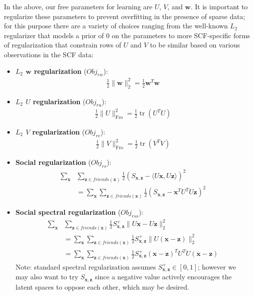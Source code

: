 \documentclass{sig-alternate}
\newcommand{\Fro}{\mathrm{Fro}}
\newcommand{\Obj}{\mathit{Obj}}
\newcommand{\ru}{\mathit{ru}}
\newcommand{\rv}{\mathit{rv}}
\newcommand{\rw}{\mathit{rw}}
\newcommand{\rs}{\mathit{rs}}
\newcommand{\rss}{\mathit{rss}}
\newcommand{\tr}{\operatorname{tr}}
\newcommand{\x}{\vec{x}}
\newcommand{\z}{\vec{z}}
\newcommand{\w}{\vec{w}}
\newcommand{\la}{\langle}
\newcommand{\ra}{\rangle}
\renewcommand{\vec}[1]{\mathbf{#1}}
\newcommand{\subfive}{\hspace{2.5mm}}
\begin{document}
In the above, our free parameters for learning are $U$, $V$, and $\w$.
It is important to regularize these parameters to prevent overfitting in
the presence of sparse data;
for this purpose there are a variety of choices ranging from the well-known
$L_2$ regularizer that models a prior of $0$ on the parameters
to more SCF-specific forms of regularization that
constrain rows of $U$ and $V$ to be similar based on various observations
in the SCF data:
\begin{itemize}
\item {\bf $L_2$ $\w$ regularization} ($\Obj_\rw$):
\begin{align}
\frac{1}{2} \| \w \|_2^2 = \frac{1}{2} \w^T \w
\end{align}
\item {\bf $L_2$ $U$ regularization} ($\Obj_\ru$):
\begin{align}
\frac{1}{2} \| U \|_\Fro^2 = \frac{1}{2} \tr(U^T U)
\end{align}
\item {\bf $L_2$ $V$ regularization} ($\Obj_\rv$):
\begin{align}
\frac{1}{2} \| V \|_\Fro^2 = \frac{1}{2} \tr(V^T V)
\end{align}
\item {\bf Social regularization} ($\Obj_\rs$):
\begin{align}
\sum_{\x} & \sum_{\z \in \mathit{friends}(\x)} \frac{1}{2} (S_{\x,\z} - \la U\x, U\z \ra)^2 \nonumber \\
& = \sum_{\x} \sum_{\z \in \mathit{friends}(\x)} \frac{1}{2} (S_{\x,\z} - \x^T U^T U \z)^2
\end{align}
\item {\bf Social spectral regularization} ($\Obj_\rss$):
\begin{align}
\sum_{\x} & \sum_{\z \in \mathit{friends}(\x)} \frac{1}{2} S^+_{\x,\z} \| U\x - U\z \|_2^2 \nonumber \\
& = \sum_{\x} \sum_{\z \in \mathit{friends}(\x)} \frac{1}{2} S^+_{\x,\z} \| U (\x - \z) \|_2^2 \nonumber \\
& = \sum_{\x} \sum_{\z \in \mathit{friends}(\x)} \frac{1}{2} S^+_{\x,\z} (\x - \z)^T U^T U (\x - \z)
\end{align}
\subfive Note: standard spectral regularization assumes $S^+_{\x,\z} \in [0,1]$;
however we may also want to try $S_{\x,\z}$ since a negative value actively
encourages the latent spaces to oppose each other, which may be desired.
\end{itemize}
\end{document}
